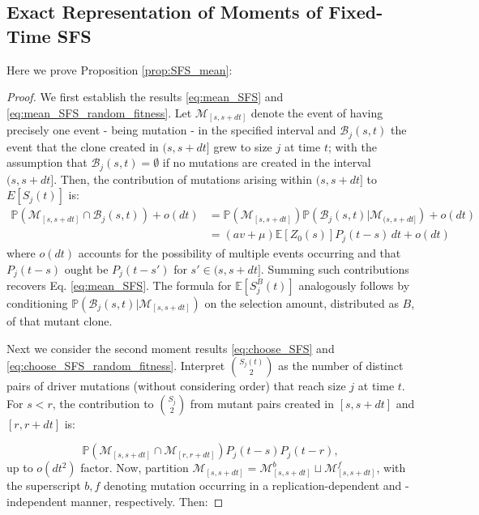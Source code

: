 \documentclass{article}
\numberwithin{equation}{section}
\begin{document}
\subsection{Exact Representation of Moments of Fixed-Time SFS}\label{app:SFS_mean}
Here we prove Proposition \ref{prop:SFS_mean}:
\SFSmean*
\begin{proof}
  We first establish the results \eqref{eq:mean_SFS} and \eqref{eq:mean_SFS_random_fitness}. Let $\mathcal{M}_{[s,s+dt]}$ denote the event of having precisely one event - being mutation - in the specified interval and $\mathcal{B}_j(s,t)$ the event that the clone created in $(s,s+dt]$ grew to size $j$ at time $t$; with the assumption that $\mathcal{B}_j(s,t)=\emptyset$ if no mutations are created in the interval $(s,s+dt]$. Then, the contribution of mutations arising within $(s,s+dt]$ to $E[S_j(t)]$ is:
  \begin{align*}
    \mathbb{P}(\mathcal{M}_{[s,s+dt]}\cap \mathcal{B}_j(s,t))+o(dt)&=\mathbb{P}(\mathcal{M}_{[s,s+dt]})\mathbb{P}(\mathcal{B}_j(s,t)|\mathcal{M}_{(s,s+dt]})+o(dt)\\
    &=(av+\mu)\mathbb{E}[Z_0(s)]P_j(t-s)\,dt+o(dt)
  \end{align*}
  where $o(dt)$ accounts for the possibility of multiple events occurring and that $P_j(t-s)$ ought be $P_j(t-s')$ for $s'\in (s,s+dt]$. Summing such contributions recovers Eq. \ref{eq:mean_SFS}. The formula for $\mathbb{E}[S_j^B(t)]$ analogously follows by conditioning $\mathbb{P}(\mathcal{B}_j(s,t)|\mathcal{M}_{[s,s+dt]})$ on the selection amount, distributed as $B$, of that mutant clone.

Next we consider the second moment results \eqref{eq:choose_SFS} and \eqref{eq:choose_SFS_random_fitness}.
Interpret $S_j(t)\choose 2$ as the number of distinct pairs of driver mutations (without considering order) that reach size $j$ at time $t$.
For $s<r$, the contribution to $S_j\choose 2$ from mutant pairs created in $[s,s+dt]$ and $[r,r+dt]$ is:

    \[\mathbb{P}(\mathcal{M}_{[s,s+dt]}\cap \mathcal{M}_{[r,r+dt]})P_j(t-s)P_j(t-r),\]
up to $o(dt^2)$ factor. Now, partition $\mathcal{M}_{[s,s+dt]}=\mathcal{M}_{[s,s+dt]}^b\sqcup \mathcal{M}_{[s,s+dt]}^f$, with the superscript $b,f$ denoting mutation occurring in a replication-dependent and -independent manner, respectively. Then:


\end{proof}
\end{document}
